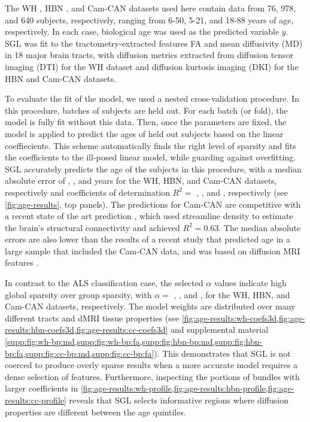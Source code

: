 \documentclass[10pt,%
               aps,%
               prl,%
               reprint,%
               superscriptaddress,%
               preprintnumbers,%
               linenumbers,%
               amsmath,%
               floatfix]{revtex4-1}
\begin{document}
The WH \cite{yeatman2014lifespan}, HBN \cite{alexander2017open}, and Cam-CAN
\cite{shafto2014cambridge,taylor2017cambridge} datasets used here contain
data from 76, 978, and 640 subjects, respectively, ranging from 6-50, 5-21,
and 18-88 years of age, respectively. In each case, biological age was used
as the predicted variable $y$. SGL was fit to the tractometry-extracted
features FA and mean diffusivity (MD) in 18 major brain tracts, with diffusion metrics extracted
from diffusion tensor imaging (DTI) for the WH dataset and diffusion kurtosis
imaging (DKI) \cite{jensen2005diffusion} for the HBN and Cam-CAN datasets.

To evaluate the fit of the model, we used a nested cross-validation
procedure. In this procedure, batches of subjects are held out. For each
batch (or fold), the model is fully fit without this data. Then, once the
parameters are fixed, the model is applied to predict the ages of held out
subjects based on the linear coeffiecients. This scheme automatically finds
the right level of sparsity and fits the coefficients to the ill-posed linear
model, while guarding against overfitting. SGL accurately predicts the age of
the subjects in this procedure, with a median absolute error of {\whMae},
{\hbnMae}, and {\camcanMae} years for the WH, HBN, and Cam-CAN datasets,
respectively and coefficients of determination $R^2 = $ {\whRsq} , {\hbnRsq},
and {\camcanRsq}, respectively (see \cref{fig:age-results}, top panels). The
predictions for Cam-CAN are competitive with a recent state of the art
prediction \cite{mcpherson2020single}, which used streamline density to
estimate the brain's structural connectivity and achieved $R^2 = 0.63$. The
median absolute errors are also lower than the results of a recent study that
predicted age in a large sample that included the Cam-CAN data, and was based
on diffusion MRI features \cite{Richard2018-ux}.

In contrast to the ALS classification case, the selected $\alpha$ values
indicate high global sparsity over group sparsity, with $\alpha = $
{\whLRatio}, {\hbnLRatio}, and {\ccLRatio}, for the WH, HBN, and Cam-CAN
datasets, respectively. The model weights are distributed over many different
tracts and dMRI tissue properties (see
\cref{fig:age-results:wh-coefs3d,fig:age-results:hbn-coefs3d,fig:age-results:cc-coefs3d}
and supplemental material
\cref{supp:fig:wh-bp:md,supp:fig:wh-bp:fa,supp:fig:hbn-bp:md,supp:fig:hbn-bp:fa,supp:fig:cc-bp:md,supp:fig:cc-bp:fa}).
This demonstrates that SGL is not coerced to produce overly sparse results
when a more accurate model requires a dense selection of features.
Furthermore, inspecting the portions of bundles with larger coefficients in
\cref{fig:age-results:wh-profile,fig:age-results:hbn-profile,fig:age-results:cc-profile}
reveals that SGL selects informative regions where diffusion properties are
different between the age quintiles.
\end{document}

